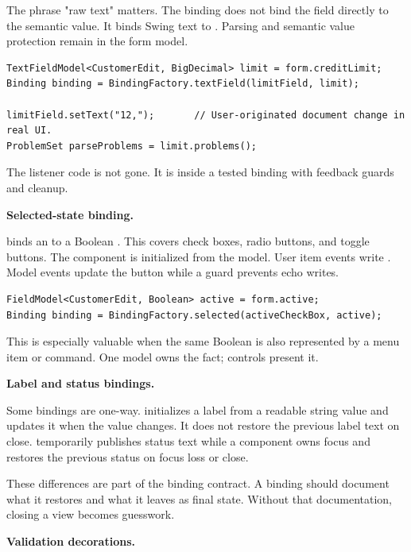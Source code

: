 The phrase "raw text" matters. The binding does not bind the field directly to
the semantic value. It binds Swing text to . Parsing
and semantic value protection remain in the form model.

\begin{lstlisting}[caption={Text binding preserves invalid intermediate input.}]
TextFieldModel<CustomerEdit, BigDecimal> limit = form.creditLimit;
Binding binding = BindingFactory.textField(limitField, limit);

limitField.setText("12,");       // User-originated document change in real UI.
ProblemSet parseProblems = limit.problems();
\end{lstlisting}

The listener code is not gone. It is inside a tested binding with feedback
guards and cleanup.

\textbf{Selected-state binding.}

 binds an  to a Boolean
. This covers check boxes, radio buttons, and toggle buttons.
The component is initialized from the model. User item events write
. Model events update the button while a guard prevents
echo writes.

\begin{lstlisting}[caption={Checkbox state belongs to the model.}]
FieldModel<CustomerEdit, Boolean> active = form.active;
Binding binding = BindingFactory.selected(activeCheckBox, active);
\end{lstlisting}

This is especially valuable when the same Boolean is also represented by a menu
item or command. One model owns the fact; controls present it.

\textbf{Label and status bindings.}

Some bindings are one-way.  initializes a label
from a readable string value and updates it when the value changes. It does not
restore the previous label text on close. 
temporarily publishes status text while a component owns focus and restores the
previous status on focus loss or close.

These differences are part of the binding contract. A binding should document
what it restores and what it leaves as final state. Without that documentation,
closing a view becomes guesswork.

\textbf{Validation decorations.}

